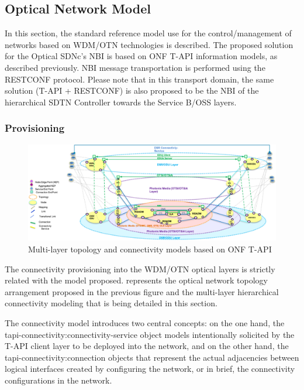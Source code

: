 \documentclass[a4paper,fleqn]{cas-dc}
\begin{document}
\subsection{Optical Network Model}
\label{section:OPTmodels}

In this section, the standard reference model use for the control/management of networks based on WDM/OTN technologies is described. The proposed solution for the Optical SDNc's NBI is based on ONF T-API information models, as described previously.  NBI message transportation is performed using the RESTCONF protocol. Please note that in this transport domain, the same solution (T-API + RESTCONF) is also proposed to be the NBI of the hierarchical SDTN Controller towards the Service B/OSS layers.

\subsubsection{Provisioning}

\begin{figure}
	\centering
		\includegraphics[scale=0.8]{figs/ONF-T-API.png}
	\caption{Multi-layer topology and connectivity models based on ONF T-API}
	\label{FIG:ONF-T-API}
\end{figure}

The connectivity provisioning into the WDM/OTN optical layers is strictly related with the model proposed.  represents the optical network topology arrangement proposed in the previous figure and the multi-layer hierarchical connectivity modeling that is being detailed in this section.

The connectivity model introduces two central concepts: on the one hand, the tapi-connectivity:connectivity-service object models intentionally solicited by the T-API client layer to be deployed into the network, and on the other hand, the tapi-connectivity:connection objects that represent the actual adjacencies between logical interfaces created by configuring the network, or in brief, the connectivity configurations in the network. 
\end{document}
